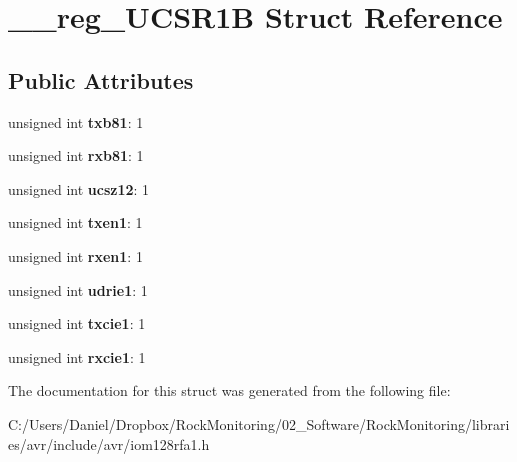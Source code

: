\hypertarget{struct____reg___u_c_s_r1_b}{}\section{\+\_\+\+\_\+reg\+\_\+\+U\+C\+S\+R1B Struct Reference}
\label{struct____reg___u_c_s_r1_b}
\subsection*{Public Attributes}
\begin{DoxyCompactItemize}
\item 
unsigned int {\bfseries txb81}\+: 1\hypertarget{struct____reg___u_c_s_r1_b_a87abbe2e19f5f79dd5f23326ea9cb447}{}\label{struct____reg___u_c_s_r1_b_a87abbe2e19f5f79dd5f23326ea9cb447}

\item 
unsigned int {\bfseries rxb81}\+: 1\hypertarget{struct____reg___u_c_s_r1_b_a80216f4a3365f22cc8f6bda4339984b1}{}\label{struct____reg___u_c_s_r1_b_a80216f4a3365f22cc8f6bda4339984b1}

\item 
unsigned int {\bfseries ucsz12}\+: 1\hypertarget{struct____reg___u_c_s_r1_b_a714afc2d1737f62349803ed56d23856a}{}\label{struct____reg___u_c_s_r1_b_a714afc2d1737f62349803ed56d23856a}

\item 
unsigned int {\bfseries txen1}\+: 1\hypertarget{struct____reg___u_c_s_r1_b_ad168cd802639ccaa114b3a207dcadebb}{}\label{struct____reg___u_c_s_r1_b_ad168cd802639ccaa114b3a207dcadebb}

\item 
unsigned int {\bfseries rxen1}\+: 1\hypertarget{struct____reg___u_c_s_r1_b_aa2e4de6cdd9672e21591084da7cfe4d9}{}\label{struct____reg___u_c_s_r1_b_aa2e4de6cdd9672e21591084da7cfe4d9}

\item 
unsigned int {\bfseries udrie1}\+: 1\hypertarget{struct____reg___u_c_s_r1_b_a937252856749ca244ca21389ea3a7c2b}{}\label{struct____reg___u_c_s_r1_b_a937252856749ca244ca21389ea3a7c2b}

\item 
unsigned int {\bfseries txcie1}\+: 1\hypertarget{struct____reg___u_c_s_r1_b_a7ea43b8cf248714d7b1bb9dc9cac7b3b}{}\label{struct____reg___u_c_s_r1_b_a7ea43b8cf248714d7b1bb9dc9cac7b3b}

\item 
unsigned int {\bfseries rxcie1}\+: 1\hypertarget{struct____reg___u_c_s_r1_b_aac16655f2dc4f7a32bfd8f3c7673a919}{}\label{struct____reg___u_c_s_r1_b_aac16655f2dc4f7a32bfd8f3c7673a919}

\end{DoxyCompactItemize}


The documentation for this struct was generated from the following file\+:\begin{DoxyCompactItemize}
\item 
C\+:/\+Users/\+Daniel/\+Dropbox/\+Rock\+Monitoring/02\+\_\+\+Software/\+Rock\+Monitoring/libraries/avr/include/avr/iom128rfa1.\+h\end{DoxyCompactItemize}
